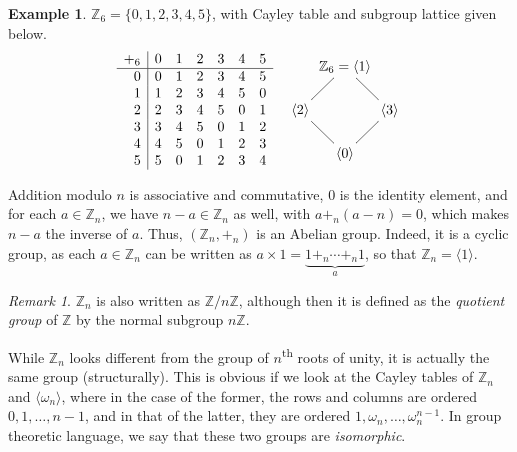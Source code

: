 \documentclass[svgnames]{article}
\theoremstyle{definition}
\newtheorem{Example}[Theorem]{Example}
\theoremstyle{remark}
\newtheorem*{Remark*}{Remark}
\renewcommand{\th}{\textsuperscript{th}\xspace}
\begin{document}
\begin{appendices}
\begin{Example}\label{ex:Z6}
$\mathbb Z_6 = \{0, 1, 2, 3, 4, 5\}$, with Cayley table and subgroup lattice given below.
\begin{align*}
\begin{array}{r|cccccc}
+_6		&	0	&	1	&	2	&	3	&	4	&	5\\
\hline
0		&	0	&	1	&	2	&	3	&	4	&	5\\
1		&	1	&	2	&	3	&	4	&	5	&	0\\
2		&	2	&	3	&	4	&	5	&	0	&	1\\
3		&	3	&	4	&	5	&	0	&	1	&	2\\
4		&	4	&	5	&	0	&	1	&	2	&	3\\
5		&	5	&	0	&	1	&	2	&	3	&	4
\end{array} && 
\vcenter{\xymatrix@C=1px@R=1.5em{
&	\mathbb Z_6 = \langle 1 \rangle \ar@{-}[dl] \ar@{-}[dr]\\
\langle 2 \rangle && \langle 3 \rangle\\
& \langle 0 \rangle \ar@{-}[ul] \ar@{-}[ur]
}}
\end{align*}
\end{Example}

Addition modulo $n$ is associative and commutative, $0$ is the identity element, and for each $a \in \mathbb Z_n$, we have $n - a \in \mathbb Z_n$ as well, with $a +_n (a - n) = 0$, which makes $n - a$ the inverse of $a$. Thus, $(\mathbb Z_n, +_n)$ is an Abelian group. Indeed, it is a cyclic group, as each $a \in \mathbb Z_n$ can be written as $a \times 1 = \underbrace{1 +_n \cdots +_n 1}_{a}$, so that $\mathbb Z_n = \langle 1 \rangle$.

\begin{Remark*}
$\mathbb Z_n$ is also written as $\mathbb Z/n \mathbb Z$, although then it is defined as the \emph{quotient group} of $\mathbb Z$ by the normal subgroup $n \mathbb Z$.
\end{Remark*}

While $\mathbb Z_n$ looks different from the group of $n$\th roots of unity, it is actually the same group (structurally). This is obvious if we look at the Cayley tables of $\mathbb Z_n$ and $\langle \omega_n \rangle$, where in the case of the former, the rows and columns are ordered $0, 1, \ldots, n - 1$, and in that of the latter, they are ordered $1, \omega_n, \ldots, \omega_n^{n - 1}$. In group theoretic language, we say that these two groups are \emph{isomorphic}.


\end{appendices}
\end{document}
